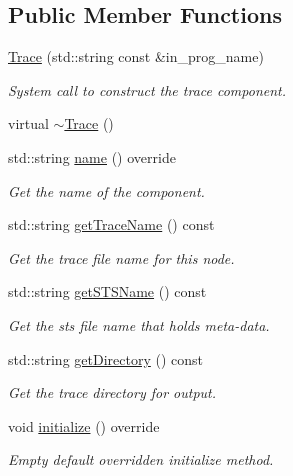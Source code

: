 \subsection*{Public Member Functions}
\begin{DoxyCompactItemize}
\item 
\hyperlink{structvt_1_1trace_1_1_trace_a2b736f560ee446cbd84aaf96e25c8d0b}{Trace} (std\+::string const \&in\+\_\+prog\+\_\+name)
\begin{DoxyCompactList}\small\item\em System call to construct the trace component. \end{DoxyCompactList}\item 
virtual \hyperlink{structvt_1_1trace_1_1_trace_a80b3426aed07572525ef4834b0c4dedd}{$\sim$\+Trace} ()
\item 
std\+::string \hyperlink{structvt_1_1trace_1_1_trace_aaae4bbf6d009229a5c8b9db67a127942}{name} () override
\begin{DoxyCompactList}\small\item\em Get the name of the component. \end{DoxyCompactList}\item 
std\+::string \hyperlink{structvt_1_1trace_1_1_trace_a6825144c1fb635304c957dee8f667b4a}{get\+Trace\+Name} () const
\begin{DoxyCompactList}\small\item\em Get the trace file name for this node. \end{DoxyCompactList}\item 
std\+::string \hyperlink{structvt_1_1trace_1_1_trace_af92da7879adc530c72945530b0bfa11d}{get\+S\+T\+S\+Name} () const
\begin{DoxyCompactList}\small\item\em Get the sts file name that holds meta-\/data. \end{DoxyCompactList}\item 
std\+::string \hyperlink{structvt_1_1trace_1_1_trace_ae2e8213035c557a769cf0fd1a41533a5}{get\+Directory} () const
\begin{DoxyCompactList}\small\item\em Get the trace directory for output. \end{DoxyCompactList}\item 
void \hyperlink{structvt_1_1trace_1_1_trace_a24019edd964c0a307008f8d6a0f1f825}{initialize} () override
\begin{DoxyCompactList}\small\item\em Empty default overridden initialize method. \end{DoxyCompactList}\item 

\end{DoxyCompactItemize}
